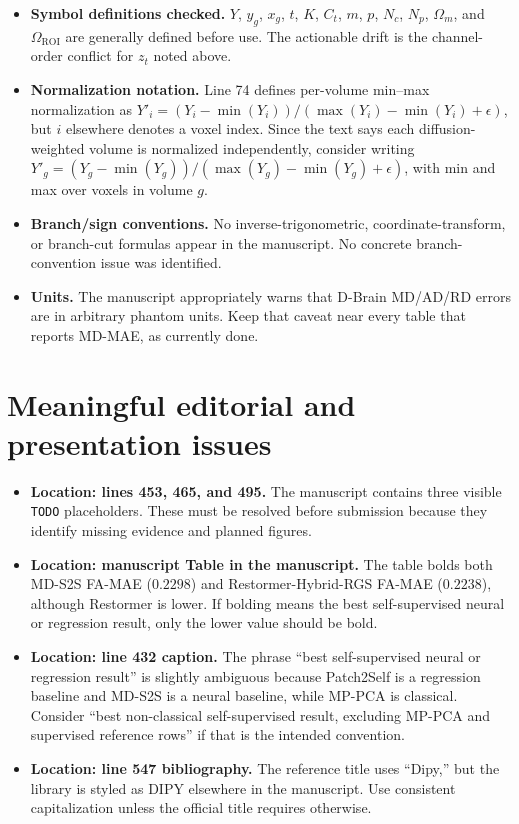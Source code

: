 \documentclass[11pt]{article}
\newcommand{\code}[1]{\texttt{\detokenize{#1}}}
\begin{document}
\begin{itemize}
  \item \textbf{Symbol definitions checked.} $Y$, $y_g$, $x_g$, $t$, $K$, $C_t$, $m$, $p$, $N_c$, $N_p$, $\Omega_m$, and $\Omega_{\mathrm{ROI}}$ are generally defined before use. The actionable drift is the channel-order conflict for $z_t$ noted above.
  \item \textbf{Normalization notation.} Line 74 defines per-volume min--max normalization as $Y'_i=(Y_i-\min(Y_i))/(\max(Y_i)-\min(Y_i)+\epsilon)$, but $i$ elsewhere denotes a voxel index. Since the text says each diffusion-weighted volume is normalized independently, consider writing $Y'_g=(Y_g-\min(Y_g))/(\max(Y_g)-\min(Y_g)+\epsilon)$, with min and max over voxels in volume $g$.
  \item \textbf{Branch/sign conventions.} No inverse-trigonometric, coordinate-transform, or branch-cut formulas appear in the manuscript. No concrete branch-convention issue was identified.
  \item \textbf{Units.} The manuscript appropriately warns that D-Brain MD/AD/RD errors are in arbitrary phantom units. Keep that caveat near every table that reports MD-MAE, as currently done.
\end{itemize}

\section*{Meaningful editorial and presentation issues}

\begin{itemize}
  \item \textbf{Location: lines 453, 465, and 495.} The manuscript contains three visible \texttt{TODO} placeholders. These must be resolved before submission because they identify missing evidence and planned figures.
  \item \textbf{Location: manuscript Table \code{tab:main_comparison} in the manuscript.} The table bolds both MD-S2S FA-MAE ($0.2298$) and Restormer-Hybrid-RGS FA-MAE ($0.2238$), although Restormer is lower. If bolding means the best self-supervised neural or regression result, only the lower value should be bold.
  \item \textbf{Location: line 432 caption.} The phrase ``best self-supervised neural or regression result'' is slightly ambiguous because Patch2Self is a regression baseline and MD-S2S is a neural baseline, while MP-PCA is classical. Consider ``best non-classical self-supervised result, excluding MP-PCA and supervised reference rows'' if that is the intended convention.
  \item \textbf{Location: line 547 bibliography.} The reference title uses ``Dipy,'' but the library is styled as DIPY elsewhere in the manuscript. Use consistent capitalization unless the official title requires otherwise.
\end{itemize}
\end{document}
